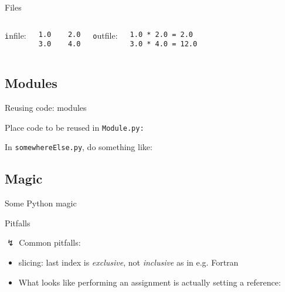 \begin{frame}[fragile]{Files}



\begin{columns}
{\texttt infile}:
\begin{verbatim}
1.0    2.0
3.0    4.0
\end{verbatim}


{\texttt outfile}:
\begin{verbatim}
1.0 * 2.0 = 2.0
3.0 * 4.0 = 12.0
\end{verbatim}  

\end{columns}

\end{frame}

\subsection{Modules}

\begin{frame}{Reusing code: modules}

Place code to be reused in {\texttt{Module.py:}}



In {\texttt{somewhereElse.py}}, do something like:



\end{frame}

\subsection{Magic}

\begin{frame}{Some Python magic}



\end{frame}

\begin{frame}{Pitfalls}

$\lightning$ Common pitfalls:

\begin{itemize}
    \item slicing: last index is \emph{exclusive}, not \emph{inclusive} as in e.g. Fortran
    
    \item What looks like performing an assignment is actually setting a reference:
    
\end{itemize}

\end{frame}

